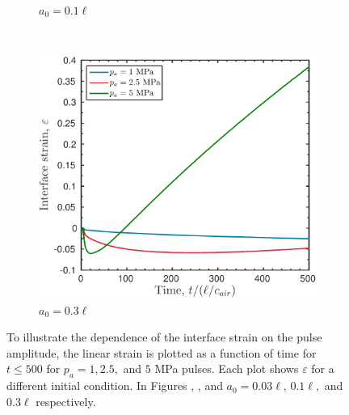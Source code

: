 \begin{figure}
\begin{subfigure}[b]{0.49\textwidth}
    \caption{\label{fig:strain_multi-pa_a10} $a_0 = 0.1\ell$}
  \end{subfigure}
  ~ 
  \begin{subfigure}[b]{0.49\textwidth}
    \includegraphics[width=\textwidth]{./figs/lung_figs/rmawave_1_A10,25,50_a30_strain_08-Mar-2017}
    \caption{\label{fig:strain_multi-pa_a30} $a_0 = 0.3\ell$}
  \end{subfigure}
  \caption{To illustrate the dependence of the interface strain on the
    pulse amplitude, the linear strain is plotted as a function of
    time for $t\leq500$ for $p_a=1, 2.5,$ and $5$ MPa pulses. Each plot
    shows $\varepsilon$ for a different initial
    condition. In Figures ,
    , and
     $a_0=0.03\ell,\, 0.1\ell,$ and
    $0.3\ell$ respectively.}
 \label{fig:pa_dependence_strain}
\end{figure}
%
